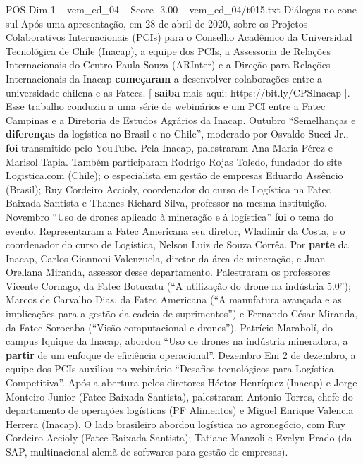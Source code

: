 \begin{textsample}{POS Dim 1 – vem\_ed\_04 – Score -3.00 – vem\_ed\_04/t015.txt}  \label{ex:f1_pos_182}
Diálogos no cone sul Após uma apresentação, em 28 de abril de 2020, sobre os Projetos Colaborativos Internacionais (PCIs) para o Conselho Acadêmico da Universidad Tecnológica de Chile (Inacap), a equipe dos PCIs, a Assessoria de Relações Internacionais do Centro Paula Souza (ARInter) e a Direção para Relações Internacionais da Inacap \textbf{começaram} a desenvolver colaborações entre a universidade chilena e as Fatecs. [ \textbf{saiba} mais aqui: https://bit.ly/CPSInacap ].
Esse trabalho conduziu a uma série de webinários e um PCI entre a Fatec Campinas e a Diretoria de Estudos Agrários da Inacap.
Outubro “Semelhanças e \textbf{diferenças} da logística no Brasil e no Chile”, moderado por Osvaldo Succi Jr., \textbf{foi} transmitido pelo YouTube.
Pela Inacap, palestraram Ana Maria Pérez e Marisol Tapia.
Também participaram Rodrigo Rojas Toledo, fundador do site Logistica.com (Chile); o especialista em gestão de empresas Eduardo Assêncio (Brasil); Ruy Cordeiro Accioly, coordenador do curso de Logística na Fatec Baixada Santista e Thames Richard Silva, professor na mesma instituição.
Novembro “Uso de drones aplicado à mineração e à logística” \textbf{foi} o tema do evento.
Representaram a Fatec Americana seu diretor, Wladimir da Costa, e o coordenador do curso de Logística, Nelson Luiz de Souza Corrêa.
Por \textbf{parte} da Inacap, Carlos Giannoni Valenzuela, diretor da área de mineração, e Juan Orellana Miranda, assessor desse departamento.
Palestraram os professores Vicente Cornago, da Fatec Botucatu (“A utilização do drone na indústria 5.0”); Marcos de Carvalho Dias, da Fatec Americana (“A manufatura avançada e as implicações para a gestão da cadeia de suprimentos”) e Fernando César Miranda, da Fatec Sorocaba (“Visão computacional e drones”).
Patrício Marabolí, do campus Iquique da Inacap, abordou “Uso de drones na indústria mineradora, a \textbf{partir} de um enfoque de eficiência operacional”.
Dezembro Em 2 de dezembro, a equipe dos PCIs auxiliou no webinário “Desafios tecnológicos para Logística Competitiva”.
Após a abertura pelos diretores Héctor Henríquez (Inacap) e Jorge Monteiro Junior (Fatec Baixada Santista), palestraram Antonio Torres, chefe do departamento de operações logísticas (PF Alimentos) e Miguel Enrique Valencia Herrera (Inacap).
O lado brasileiro abordou logística no agronegócio, com Ruy Cordeiro Accioly (Fatec Baixada Santista); Tatiane Manzoli e Evelyn Prado (da SAP, multinacional alemã de softwares para gestão de empresas).

\end{textsample}
